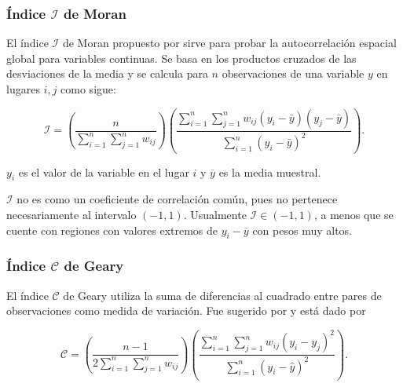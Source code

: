 


\subsubsection{Índice $\mathcal{I}$ de Moran} 
El índice $\mathcal{I}$ de Moran propuesto por \citet{moran50} sirve para probar la autocorrelación espacial global para variables continuas. Se basa en los productos cruzados de las desviaciones de la media y se calcula para  $n$ observaciones de una variable $y$ en lugares $i,j$ como sigue:

\begin{equation}
\mathcal{I} = \left( \dfrac{n}{\displaystyle \sum_{i=1}^n \sum_{j=1}^n w_{ij}} \right) \left( \dfrac{\displaystyle \sum_{i=1}^n \sum_{j=1}^n w_{ij} (y_{i} - \bar{y}) (y_{j} - \bar{y}) }{\displaystyle \sum_{i=1}^n (y_{i} - \bar{y})^2} \right).
\end{equation}

$y_{i}$ es el valor de la variable en el lugar $i$ y $\overline{y}$ es la media muestral.

$\mathcal{I}$ no es como un coeficiente de correlación común, pues no pertenece necesariamente al intervalo $(-1,1)$. Usualmente $\mathcal{I} \in (-1,1)$, a menos que se cuente con regiones con valores extremos de $y_{i} - \overline{y}$ con pesos muy altos.


\subsubsection{Índice $\mathcal{C}$ de Geary} 
El índice $\mathcal{C}$ de Geary utiliza la suma de diferencias al cuadrado entre pares de observaciones como medida de variación. Fue sugerido por \citet{geary54} y está dado por

\begin{equation}
\mathcal{C} =  \left(\dfrac{n-1}{\displaystyle 2 \sum_{i=1}^n \sum_{j=1}^n w_{ij}}\right)  \left( \dfrac{\displaystyle \sum_{i=1}^n \sum_{j=1}^n w_{ij} (y_{i} - y_{j})^2}{\displaystyle \sum_{i=1}^n (y_{i} - \hat{y})^2}\right).
\end{equation}

